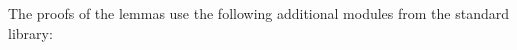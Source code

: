 \begin{AgdaAlign}
\begin{code}
\>[.][@{}l@{}]\<[466I]%
\>[15]\AgdaOperator{\AgdaBound{]⊥}}\AgdaSpace{}%
\AgdaSymbol{(}\AgdaSpace{}%
\AgdaSymbol{(}\AgdaSpace{}%
\AgdaSymbol{(}\AgdaSpace{}%
\AgdaSpace{}%
\AgdaSpace{}%
\AgdaSpace{}%
\AgdaSpace{}%
\AgdaSpace{}%
\AgdaSpace{}%
\AgdaSymbol{)}\AgdaSpace{}%
\AgdaSymbol{))}\<%
\\
%
\>[2]\AgdaSpace{}%
\AgdaSpace{}%
\AgdaSpace{}%
\AgdaSpace{}%
\AgdaSpace{}%
\AgdaSpace{}%
\AgdaSpace{}%
\AgdaSpace{}%
\AgdaSpace{}%
\AgdaSymbol{=}\<%
\\
\>[2][@{}l@{\AgdaIndent{0}}]%
\>[4]\AgdaSpace{}%
\AgdaSpace{}%
\AgdaSpace{}%
\AgdaSpace{}%
\AgdaSpace{}%
\AgdaSpace{}%
\AgdaSpace{}%
\AgdaSymbol{(}\AgdaSpace{}%
\AgdaSymbol{(}\AgdaSpace{}%
\AgdaSpace{}%
\AgdaSpace{}%
\AgdaSpace{}%
\AgdaSpace{}%
\AgdaSpace{}%
\AgdaSymbol{)}\AgdaSpace{}%
\AgdaSymbol{)}\<%
\end{code}
%
The proofs of the lemmas use the following additional modules from the standard library:
%
%
\begin{code}%
%
\>[2]\AgdaSpace{}%
\AgdaSpace{}%
\<%
\\
\>[2][@{}l@{\AgdaIndent{0}}]%
\>[4]\AgdaSpace{}%
\AgdaSymbol{(}\AgdaSymbol{;}\AgdaSpace{}%

\end{code}
\end{AgdaAlign}
